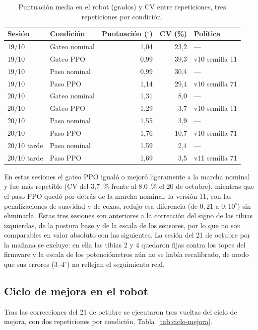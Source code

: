 \begin{table}[H]
\centering
\caption{Puntuación media en el robot (grados) y CV entre repeticiones, tres repeticiones por condición.}
\label{tab:repetibilidad-fisica}
\small
\begin{tabular}{llrrl}
\toprule
Sesión & Condición & Puntuación ($^\circ$) & CV (\%) & Política \\
\midrule
19/10 & Gateo nominal & 1,04 & 23,2 & --- \\
19/10 & Gateo PPO & 0,99 & 39,3 & v10 semilla 11 \\
19/10 & Paso nominal & 0,99 & 30,4 & --- \\
19/10 & Paso PPO & 1,14 & 29,4 & v10 semilla 71 \\
\midrule
20/10 & Gateo nominal & 1,31 & 8,0 & --- \\
20/10 & Gateo PPO & 1,29 & 3,7 & v10 semilla 11 \\
20/10 & Paso nominal & 1,55 & 3,9 & --- \\
20/10 & Paso PPO & 1,76 & 10,7 & v10 semilla 71 \\
\midrule
20/10 tarde & Paso nominal & 1,59 & 2,4 & --- \\
20/10 tarde & Paso PPO & 1,69 & 3,5 & v11 semilla 71 \\
\bottomrule
\end{tabular}
\end{table}

En estas sesiones el gateo PPO igualó o mejoró ligeramente a la marcha nominal
y fue más repetible (CV del 3,7~\% frente al 8,0~\% el 20 de octubre), mientras
que el paso PPO quedó por detrás de la marcha nominal; la versión 11, con las
penalizaciones de suavidad y de coxas, redujo esa diferencia (de $0{,}21$ a
$0{,}10^\circ$) sin eliminarla. Estas tres sesiones son anteriores a la
corrección del signo de las tibias izquierdas, de la postura base y de la escala
de los sensores, por lo que no son comparables en valor absoluto con las
siguientes. La sesión del 21 de octubre por la mañana se excluye: en ella las
tibias 2 y 4 quedaron fijas contra los topes del firmware y la escala de los
potenciómetros aún no se había recalibrado, de modo que sus errores
($3$--$4^\circ$) no reflejan el seguimiento real.

\subsection{Ciclo de mejora en el robot}

Tras las correcciones del 21 de octubre se ejecutaron tres vueltas del ciclo de
mejora, con dos repeticiones por condición, Tabla~\ref{tab:ciclo-mejora}.

